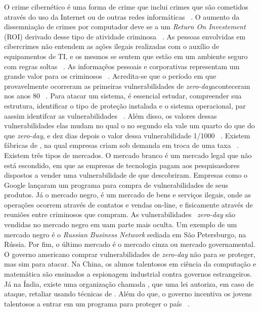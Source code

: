\documentclass[brazil, utf8]{article}
\begin{document}
O crime cibernético é uma forma de crime que inclui crimes que são cometidos através do uso da
Internet ou de outras redes informáticas ~\cite{Armin:2015}. O aumento da dissemniação de crimes
por computador deve se a um \textit{Return On Investement} (ROI) derivado desse tipo de atividade 
criminosa ~\cite{Armin:2015}. As pessoas envolvidas em cibercrimes não entendem as ações ilegais   
realizadas com o auxílio de equipamentos de TI, e os mesmos se sentem que estão em um ambiente 
seguro com regras soltas ~\cite{Armin:2015}. As informaçẽos pessoais e corporativas representam um 
grande valor para os criminosos ~\cite{Armin:2015}. Acredita-se que o período em que provavelmente 
ocorreram as primeiras vulnerabilidades de \textit{zero-day}aconteceram nos anos 80 ~\cite{
Armin:2015}. Para atacar um sistema, é essencial estudar, compreender sua estrutura, identificar o 
tipo de proteção instalada e o sistema operacional, par aassim identifcar as vulnerabilidades
~\cite{Armin:2015}. Além disso, os valores dessas vulnerabilidades elas mudam no qual o no segundo 
ela vale um quarto do que do que \textit{zero-day}, e dez dias depois o valor dessa 
vulnerabilidade 1/1000 ~\cite{Armin:2015}. Existem fábricas de , na qual empresas 
criam  sob demanda em troca de uma taxa ~\cite{Armin:2015}. Existem três tipos de 
mercados. O mercado branco é um mercado legal que não está escondido, em que as empresas de 
tecnologia pagam aos pesquisasdores dispostos a vender uma vulnerabilidade de  que 
descobriram. Empresas como o Google lançaram um programa para compra de vulnerabilidades de seus 
produtos. Já o mercado negro, é um mercado de bens e serviços ilegais, onde as operações ocorrem  
através de contatos e vendas on-line, e fisicamente através de reuniões entre criminosos que 
compram. As vulnerabilidades ~\textit{zero-day} são vendidas no mercado negro em uam parte mais 
oculta. Um exemplo de um mercado negro é o \textit{Russian Business Network} sediada em São 
Petersburgo, na Rússia. Por fim, o último mercado é o mercado cinza ou mercado governamental. O 
governo americano comprar vulnerabilidades de \textit{zero-day} não para se proteger, mas sim para 
atacar. Na China, os alunos talentosos em ciência da computação e matemática são ensinados a 
espionagem industrial contra governos estrangeiros. Já na Índia, existe uma organização chamada 
, que uma lei autoriza, em caso de ataque, 
retaliar usando técnicas de . Além do que, o governo incentiva os jovens talentosos 
a entrar em um programa para proteger o país ~\cite{Armin:2015}.



\end{document}
